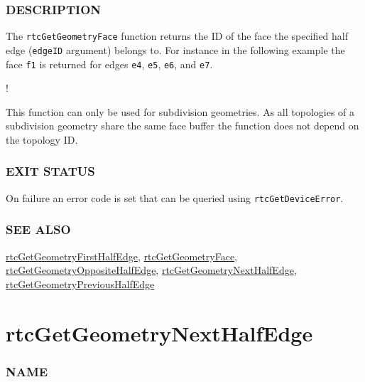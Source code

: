 \subsubsection{DESCRIPTION}\label{description}

The \texttt{rtcGetGeometryFace} function returns the ID of the face the
specified half edge (\texttt{edgeID} argument) belongs to. For instance
in the following example the face \texttt{f1} is returned for edges
\texttt{e4}, \texttt{e5}, \texttt{e6}, and \texttt{e7}.

!\href{images/half_edges.pdf}{}

This function can only be used for subdivision geometries. As all
topologies of a subdivision geometry share the same face buffer the
function does not depend on the topology ID.

\subsubsection{EXIT STATUS}\label{exit-status}

On failure an error code is set that can be queried using
\texttt{rtcGetDeviceError}.

\subsubsection{SEE ALSO}\label{see-also}

\hyperref[rtcgetgeometryfirsthalfedge]{rtcGetGeometryFirstHalfEdge},
\hyperref[rtcgetgeometryface]{rtcGetGeometryFace},
\hyperref[rtcgetgeometryoppositehalfedge]{rtcGetGeometryOppositeHalfEdge},
\hyperref[rtcgetgeometrynexthalfedge]{rtcGetGeometryNextHalfEdge},
\hyperref[rtcgetgeometryprevioushalfedge]{rtcGetGeometryPreviousHalfEdge}

\pagebreak

\section{rtcGetGeometryNextHalfEdge}\label{rtcgetgeometrynexthalfedge}

\subsubsection{NAME}\label{name}

\begin{Shaded}
\begin{Highlighting}[]
\OperatorTok{{-}}
\end{Highlighting}
\end{Shaded}

